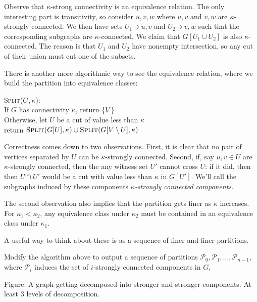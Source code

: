 \documentclass[12pt]{article}
\begin{document}
Observe that $\kappa$-strong connectivity is an equivalence relation. The only
interesting part is transitivity, so consider $u, v, w$ where $u, v$ and $v, w$
are $\kappa$-strongly connected. We then have sets $U_1 \ni u, v$ and
$U_2 \ni v, w$ such that the corresponding subgraphs are $\kappa$-connected. We
claim that $G[ U_1 \cup U_2 ]$ is also $\kappa$-connected. The reason is that
$U_1$ and $U_2$ have nonempty intersection, so any cut of their union must cut
one of the subsets.

There is another more algorithmic way to see the equivalence relation, where we
build the partition into equivalence classes:
\begin{centeralgo}
  \textsc{Split}($G, \kappa$):\+
  \\ If $G$ has connectivity $\kappa$, return $\Set{V}$
  \\ Otherwise, let $U$ be a cut of value less than $\kappa$
  \\ return $\textsc{Split}(G[U], \kappa) \cup \textsc{Split}(G[V \setminus U], \kappa)$
\end{centeralgo}

Correctness comes down to two observations. First, it is clear that no pair of
vertices separated by $U$ can be $\kappa$-strongly connected. Second, if, say
$u, v \in U$ are $\kappa$-strongly connected, then the any witness set $U'$
cannot cross $U$: if it did, then then $U \cap U'$ would be a cut with value
less than $\kappa$ in $G[U']$. We'll call the subgraphs induced by these
components \emph{$\kappa$-strongly connected components}.

The second observation also implies that the partition gets finer as $\kappa$
increases. For $\kappa_1 < \kappa_2$, any equivalence class under $\kappa_2$
must be contained in an equivalence class under $\kappa_1$.

A useful way to think about these is as a sequence of finer and finer
partitions.
\def\P{\mathcal{P}}
\begin{exercise}
  Modify the algorithm above to output a sequence of partitions
  $\P_0, \P_1, \dots, \P_{n-1}$, where $\P_i$ induces the set of $i$-strongly
  connected components in $G$,
\end{exercise}

\begin{center}
  Figure: A graph getting decomposed into stronger and stronger components. At
  least 3 levels of decomposition.
\end{center}
\end{document}
